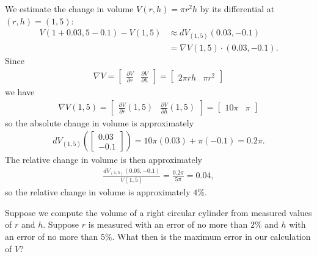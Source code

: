 \documentclass[12pt,letterpaper,reqno]{article}
\numberwithin{equation}{section}
\begin{document}
{\begin{example}
We estimate the change in volume $V(r,h)=\pi r^2h$ by its differential at $(r,h)=(1,5)$:
\begin{align*}
	V(1+0.03,5-0.1)-V(1,5) &\approx dV_{(1,5)}(0.03,-0.1)\\
	&=\nabla V(1,5)\cdot (0.03,-0.1).
\end{align*}
Since
\begin{align*}
\nabla V=\begin{bmatrix}
	\frac{\partial V}{\partial r} & \frac{\partial V}{\partial h}
\end{bmatrix}=\begin{bmatrix}
	2\pi rh & \pi r^2
\end{bmatrix}
\end{align*}
we have
\begin{align*}
\nabla V(1,5)=\begin{bmatrix}
	\frac{\partial V}{\partial r}(1,5) & \frac{\partial V}{\partial h}(1,5)
\end{bmatrix}=\begin{bmatrix}
	10\pi & \pi 
\end{bmatrix}
\end{align*}	
so the absolute change in volume is approximately
\begin{align*}
	dV_{(1,5)}(\begin{bmatrix}
		0.03 \\ -0.1
	\end{bmatrix})=10\pi(0.03)+\pi(-0.1)=0.2\pi.
\end{align*}
The relative change in volume is then approximately
\begin{align*}
	 \frac{dV_{(1,5)}(0.03,-0.1)}{V(1,5)}=\frac{0.2\pi}{5\pi}=0.04,
\end{align*}
so the relative change in volume is approximately $4\%$.
\end{example}





\begin{example}
	Suppose we compute the volume of a right circular cylinder from measured values of $r$ and $h$. Suppose $r$ is measured with an error of no more than $2\%$ and $h$ with an error of no more than $5\%$.  What then is the maximum error in our calculation of $V$?
	

\end{example}}
\end{document}
